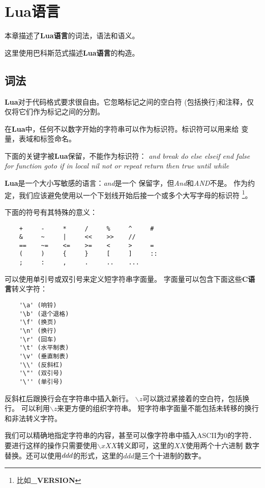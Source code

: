 \documentclass{ctexart}
\begin{document}
\section{Lua语言}

本章描述了\textbf{Lua语言}的词法，语法和语义。

这里使用巴科斯范式描述\textbf{Lua语言}的构造。

\subsection{词法}

\textbf{Lua}对于代码格式要求很自由。它忽略标记之间的空白符
(包括换行)和注释，仅仅将它们作为标记之间的分割。

在\textbf{Lua}中，任何不以数字开始的字符串可以作为标识符。标识符可以用来给
变量，表域和标签命名。

下面的关键字被\textbf{Lua}保留，不能作为标识符：
\emph{
and		break	do			else		elseif		end
false	for		function	goto		if			in
local	nil		not			or			repeat		return
then	true	until		while
}

\textbf{Lua}是一个大小写敏感的语言：\emph{and}是一个
保留字，但\emph{And}和\emph{AND}不是。
作为约定，我们应该避免使用以一个下划线开始后接一个或多个大写字母的标识符
\footnote{比如\textbf{\_VERSION}}。

下面的符号有其特殊的意义：

\lstset{language=C}
\begin{lstlisting}
	+     -     *     /     %     ^     #
	&     ~     |     <<    >>    //
	==    ~=    <=    >=    <     >     =
	(     )     {     }     [     ]     ::
	;     :     ,     .     ..    ...
\end{lstlisting}

可以使用单引号或双引号来定义短字符串字面量。
字面量可以包含下面这些\textbf{C语言}转义字符：

\lstset{language=C}
\begin{lstlisting}
	'\a' (响铃)
	'\b' (退个退格)
	'\f' (换页)
	'\n' (换行)
	'\r' (回车)
	'\t' (水平制表)
	'\v' (垂直制表)
	'\\' (反斜杠)
	'\"' (双引号)
	'\'' (单引号)
\end{lstlisting}

反斜杠后跟换行会在字符串中插入新行。
$\backslash z$可以跳过紧接着的空白符，包括换行。
可以利用$\backslash z$来更方便的组织字符串。
短字符串字面量不能包括未转移的换行和非法转义字符。

我们可以精确地指定字符串的内容，甚至可以像字符串中插入ASCII为0的字符．
要进行这样的操作只需要使用$\backslash xXX$转义即可，这里的$XX$使用两个十六进制
数字替换。还可以使用$\\ddd$的形式，这里的$ddd$是三个十进制的数字。
\end{document}
